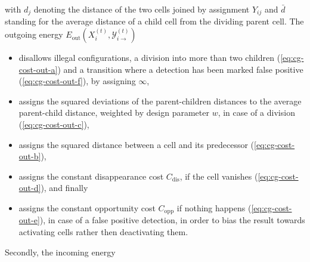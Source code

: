 with $d_j$ denoting the distance of the two cells joined by assignment $Y_{ij}$ and $\bar{d}$
standing for the average distance of a child cell from the dividing parent cell. The outgoing energy
$E_{\mathrm{out}}(X_i^{(t)},\mathcal{Y}_{i\rightarrow}^{(t)})$
\begin{itemize}
      \item disallows illegal configurations, \ie a division into more than two children
    (\ref{eq:cg-cost-out-a}) and a transition where a detection has been marked false positive (\ref{eq:cg-cost-out-f}), by
    assigning $\infty$,
      \item assigns the squared deviations of the parent-children distances to the average
    parent-child distance, weighted by design parameter $w$, in case of a
    division (\ref{eq:cg-cost-out-c}),
      \item assigns the squared distance between a cell and its predecessor  (\ref{eq:cg-cost-out-b}),
      \item assigns the constant disappearance cost $C_{\text{dis}}$, if the cell vanishes  (\ref{eq:cg-cost-out-d}), and finally
      \item assigns the constant opportunity cost $C_{\text{opp}}$ if nothing happens
    (\ref{eq:cg-cost-out-e}), \ie in case of a false positive detection, in order to bias the result
    towards activating cells rather then deactivating them.
\end{itemize}

Secondly, the incoming energy


